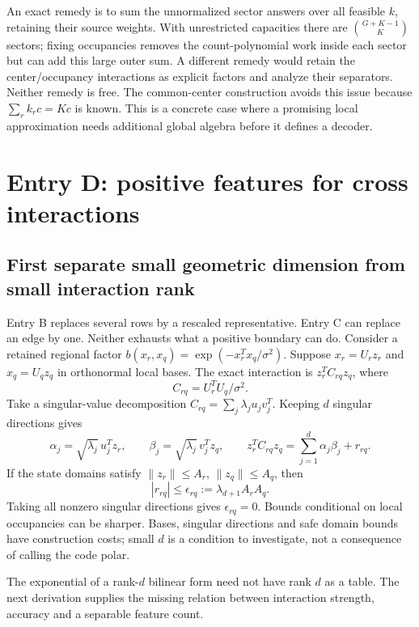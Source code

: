 \documentclass[10pt,a4paper]{article}
\begin{document}
An exact remedy is to sum the unnormalized sector answers over all feasible $k$, retaining their source
weights. With unrestricted capacities there are $\binom{G+K-1}{K}$ sectors; fixing occupancies removes the
count-polynomial work inside each sector but can add this large outer sum. A different remedy would retain
the center/occupancy interactions as explicit factors and analyze their separators. Neither remedy is free.
The common-center construction avoids this issue because $\sum_r k_rc=Kc$ is known. This is a concrete
case where a promising local approximation needs additional global algebra before it defines a decoder.

\clearpage
\section{Entry D: positive features for cross interactions}
\label{sec:positive-features}
\subsection{First separate small geometric dimension from small interaction rank}
Entry B replaces several rows by a rescaled representative. Entry C can replace an edge by one. Neither
exhausts what a positive boundary can do. Consider a retained regional factor
$b(x_r,x_q)=\exp(-x_r^Tx_q/\sigma^2)$. Suppose $x_r=U_r z_r$ and $x_q=U_q z_q$ in orthonormal local bases.
The exact interaction is $z_r^TC_{rq}z_q$, where
\[
 C_{rq}=U_r^TU_q/\sigma^2.
\]
Take a singular-value decomposition $C_{rq}=\sum_j\lambda_j u_jv_j^T$. Keeping $d$ singular directions gives
\[
 \alpha_j=\sqrt{\lambda_j}\,u_j^Tz_r,\qquad
 \beta_j=\sqrt{\lambda_j}\,v_j^Tz_q,\qquad
 z_r^TC_{rq}z_q=\sum_{j=1}^d\alpha_j\beta_j+r_{rq}.
\]
If the state domains satisfy $\|z_r\|\leq A_r$, $\|z_q\|\leq A_q$, then
\begin{equation}
 |r_{rq}|\leq\epsilon_{rq}:=\lambda_{d+1}A_rA_q.
 \label{eq:geometric-rank}
\end{equation}
Taking all nonzero singular directions gives $\epsilon_{rq}=0$. Bounds conditional on local occupancies
can be sharper. Bases, singular directions and safe domain bounds have construction costs; small $d$ is a
condition to investigate, not a consequence of calling the code polar.

The exponential of a rank-$d$ bilinear form need not have rank $d$ as a table. The next derivation supplies
the missing relation between interaction strength, accuracy and a separable feature count.
\end{document}
